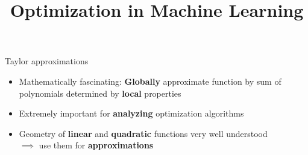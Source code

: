 \documentclass[11pt,compress,t,notes=noshow, xcolor=table]{beamer}
\title{Optimization in Machine Learning}
\begin{document}


\begin{vbframe}{Taylor approximations}

\begin{itemize}
    \item Mathematically fascinating: \textbf{Globally} approximate function by sum of polynomials determined by \textbf{local} properties
    \item Extremely important for \textbf{analyzing} optimization algorithms
    \item Geometry of \textbf{linear} and \textbf{quadratic} functions very well understood \\ $\implies$ use them for \textbf{approximations}
\end{itemize}


\end{vbframe}
\end{document}
